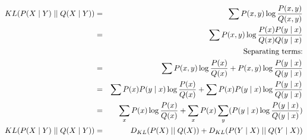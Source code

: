 \begin{answer}

\begin{eqnarray*}
KL(P(X \mid Y)\mid\mid Q(X \mid Y)) &=& \sum P(x,y) \log \frac{P(x,y)}{Q(x,y)} \\
&=& \sum P(x,y) \log \frac{P(x)P(y\mid x)}{Q(x)Q(y \mid x)} \\
&&\hspace*{-63pt}\text{Separating terms:} \\
&=& \sum P(x,y) \log \frac{P(x)}{Q(x)} + P(x,y) \log \frac{P(y\mid x)}{Q(y \mid x)}  \\
&=& \sum P(x) P(y\mid x)  \log \frac{P(x)}{Q(x)} + \sum P(x) P(y\mid x) \log \frac{P(y\mid x)}{Q(y \mid x)}  \\
&=& \sum_x P(x) \log \frac{P(x)}{Q(x)} + \sum_x P(x) \sum_y(P(y\mid x) \log \frac{P(y\mid x)}{Q(y \mid x)})  \\
KL(P(X \mid Y)\mid\mid Q(X \mid Y)) &=& D_{KL}(P(X) \mid\mid Q(X)) + D_{KL}(P(Y\mid X) \mid\mid Q(Y\mid X))
\end{eqnarray*}

\end{answer}
